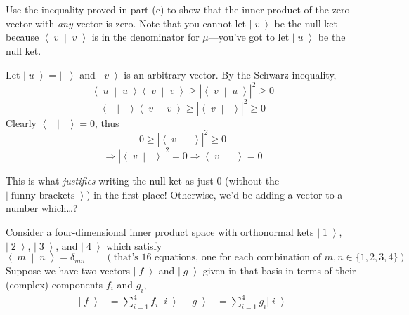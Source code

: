 \documentclass[answers]{exam}\newcommand{\repositoryInformationSetup}{     \usepackage[dvipsnames]{xcolor}     \usepackage[ angle=90, color=black, opacity=1, scale=2, ]{background}      \SetBgPosition{current page.west}      \SetBgVshift{-4.5mm}      \backgroundsetup{contents={{\color{green}\texttt{-{}-} differs from commit \texttt{aac605f} in 0 files}}} } \newcommand{\commit}{{{\color{green}aac605f}}}\usepackage{amsmath}
\newcommand{\abs}[1]{\ensuremath{\left| #1 \right|}\xspace}
\newcommand{\ket}[1]{\ensuremath{\left|\;#1\;\right\rangle}}
\newcommand{\bra}[1]{\ensuremath{\left\langle\;#1\;\right|}}
\newcommand{\bracket}[2]{\ensuremath{\left\langle\;#1\;\middle|\;#2\;\right\rangle}}
\let\braket\bracket
\begin{document}
\begin{questions}
\begin{parts}
		Use the inequality proved in part (c) to show that the inner product of the zero vector with \emph{any} vector is zero.
		Note that you cannot let \ket{v} be the null ket because \braket{v}{v} is in the denominator for $\mu$---you've got to let \ket{u} be the null ket.

		\begin{solution}

			Let $\ket{u}=\ket{}$ and $\ket{v}$ is an arbitrary vector. By the Schwarz inequality,
			$$ \braket{u}{u} \braket{v}{v} \geq \abs{\braket{v}{u}}^2 \geq 0$$
			$$ \braket{}{} \braket{v}{v} \geq \abs{\braket{v}{}}^2 \geq 0$$
			Clearly $\braket{}{} = 0$, thus
			$$ 0 \geq \abs{\braket{v}{}}^2 \geq 0$$
			$$\Rightarrow \abs{\braket{v}{}}^2 = 0 \Rightarrow \braket{v}{} = 0$$
		\end{solution}

		This is what \emph{justifies} writing the null ket as just 0 (without the \ket{\text{funny brackets}}) in the first place!  Otherwise, we'd be adding a vector to a number which\ldots?
	\end{parts}

	\question Consider a four-dimensional inner product space with orthonormal kets $\ket{1}$, \ket{2}, \ket{3}, and \ket{4} which satisfy
	\begin{equation}
		\braket{m}{n} = \delta_{mn}	\qquad (\text{that's 16 equations, one for each combination of } m,n \in \{1,2,3,4\})
	\end{equation}
	Suppose we have two vectors $\ket{f}$ and $\ket{g}$ given in that basis in terms of their (complex) components $f_i$ and $g_i$,
	\begin{align}
		\ket{f} & = \sum_{i=1}^{4} f_i \ket{i}
		        &
		\ket{g} & = \sum_{i=1}^{4} g_i \ket{i}
	\end{align}

\end{questions}
\end{document}
